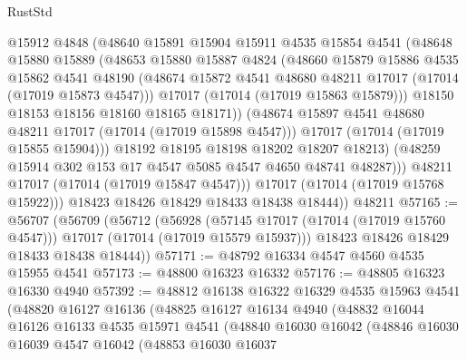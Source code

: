 \begin{lexlean}{RustStd}
\begin{coremodule}
{\begin{coremodule}
{{{{{{{{{{{{{{{{{{{{{{{{{{{{{{{{{{{{{{{{{{{{{{{{{{{{{{{                  @15912
                  @4848
                  (@48640
                    @15891
                    @15904
                    @15911
                    @4535
                    @15854
                    @4541
                    (@48648
                      @15880
                      @15889
                      (@48653
                        @15880
                        @15887
                        @4824
                        (@48660
                          @15879
                          @15886
                          @4535
                          @15862
                          @4541
                          @48190
                          (@48674 @15872 @4541 @48680 @48211 @17017 (@17014 (@17019 @15873 @4547)))
                          @17017
                          (@17014 (@17019 @15863 @15879)))
                        @18150
                        @18153
                        @18156
                        @18160
                        @18165
                        @18171))
                    (@48674 @15897 @4541 @48680 @48211 @17017 (@17014 (@17019 @15898 @4547)))
                    @17017
                    (@17014 (@17019 @15855 @15904)))
                  @18192
                  @18195
                  @18198
                  @18202
                  @18207
                  @18213)
                (@48259 @15914 @302 @153 @17 @4547 @5085 @4547 @4650 @48741 @48287)))
            @48211
            @17017
            (@17014 (@17019 @15847 @4547)))
          @17017
          (@17014 (@17019 @15768 @15922)))
        @18423
        @18426
        @18429
        @18433
        @18438
        @18444))
    @48211
@57165 := @56707
    (@56709
      (@56712
        (@56928
          (@57145 @17017 (@17014 (@17019 @15760 @4547)))
          @17017
          (@17014 (@17019 @15579 @15937)))
        @18423
        @18426
        @18429
        @18433
        @18438
        @18444))
@57171 := @48792 @16334 @4547 @4560 @4535 @15955 @4541
@57173 := @48800 @16323 @16332
@57176 := @48805 @16323 @16330 @4940
@57392 := @48812
    @16138
    @16322
    @16329
    @4535
    @15963
    @4541
    (@48820
      @16127
      @16136
      (@48825
        @16127
        @16134
        @4940
        (@48832
          @16044
          @16126
          @16133
          @4535
          @15971
          @4541
          (@48840
            @16030
            @16042
            (@48846
              @16030
              @16039
              @4547
              @16042
              (@48853
                @16030
                @16037
}}}}}}}}}}}}}}}}}}}}}}}}}}}}}}}}}}}}}}}}}}}}}}}}}}}}}}}
\end{coremodule}}
\end{coremodule}
\end{lexlean}
